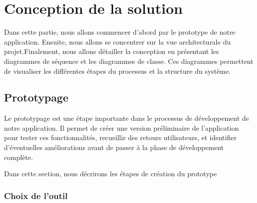 \chapter{Conception de la solution}
\label{Conception de la solution}



Dans cette partie, nous allons commencer d’abord par le prototype de notre application. Ensuite, nous allons se concentrer sur la  vue architecturale du projet.Finalement, nous allons détailler la conception en présentant les
diagrammes de séquence et les diagrammes de classe. Ces diagrammes permettent de visualiser les différentes étapes du processus et la structure du système.

\pagebreak
\section{Prototypage}

Le prototypage est une étape importante dans le processus de développement de notre application. Il permet de créer une version préliminaire de
 l'application pour tester ces fonctionnalités, recueillir des retours utilisateurs, et identifier d'éventuelles améliorations avant de passer à la phase de développement complète.

 Dans cette section, nous décrirons les étapes de création du prototype

\subsection{Choix de l'outil}

